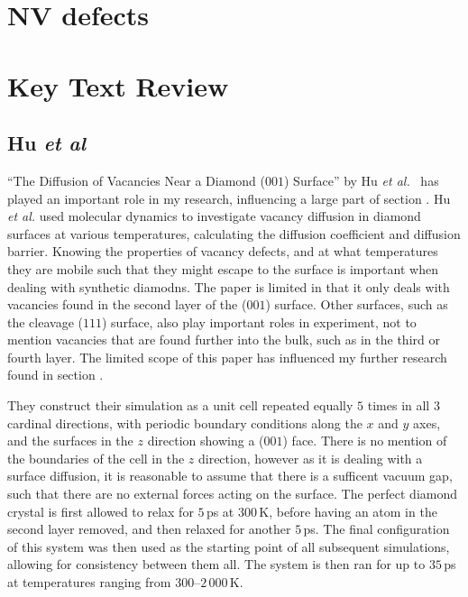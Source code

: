 \documentclass[10pt,a4paper,twocolumn,twoside]{extarticle}
\newcommand{\al}{\emph{et al. }}
\begin{document}

\section{NV defects}


\section{Key Text Review}
\subsection{Hu \textit{et al}}
\label{Hu}
``The Diffusion of Vacancies Near a Diamond ($001$) Surface'' by Hu \al~has played an important role in my research, influencing a large part of section . Hu \al used molecular dynamics to investigate vacancy diffusion in diamond surfaces at various temperatures, calculating the diffusion coefficient and diffusion barrier. Knowing the properties of vacancy defects, and at what temperatures they are mobile such that they might escape to the surface is important when dealing with synthetic diamodns. The paper is limited in that it only deals with vacancies found in the second layer of the ($001$) surface. Other surfaces, such as the cleavage ($111$) surface, also play important roles in experiment, not to mention vacancies that are found further into the bulk, such as in the third or fourth layer. The limited scope of this paper has influenced my further research found in section .

They construct their simulation as a unit cell repeated equally $5$ times in all $3$ cardinal directions, with periodic boundary conditions along the $x$ and $y$ axes, and the surfaces in the $z$ direction showing a ($001$) face. There is no mention of the boundaries of the cell in the $z$ direction, however as it is dealing with a surface diffusion, it is reasonable to assume that there is a sufficent vacuum gap, such that there are no external forces acting on the surface. The perfect diamond crystal is first allowed to relax for $5$\,ps at $300$\,K, before having an atom in the second layer removed, and then relaxed for another $5$\,ps. The final configuration of this system was then used as the starting point of all subsequent simulations, allowing for consistency between them all. The system is then ran for up to $35$\,ps at temperatures ranging from $300$--$2\,000$\,K. 
\end{document}
